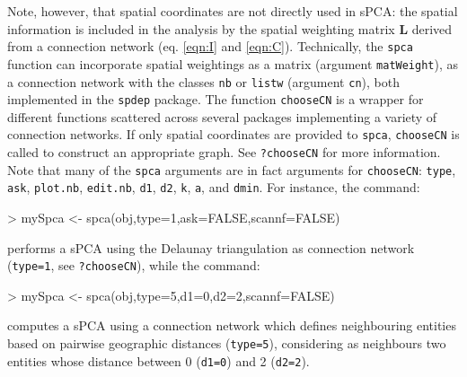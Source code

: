\documentclass{article}
\newcommand{\m}[1]{\mathbf{#1}}
\begin{document}
Note, however, that spatial coordinates are not directly used in sPCA:
the spatial information is included in the analysis by the spatial
weighting matrix $\m{L}$ derived from a connection network (eq. \ref{eqn:I} and \ref{eqn:C}).
Technically, the \texttt{spca} function can incorporate spatial weightings as a matrix (argument
\texttt{matWeight}), as a connection network with the classes
\texttt{nb} or \texttt{listw} (argument \texttt{cn}), both implemented in the \texttt{spdep} package.
The function \texttt{chooseCN} is a wrapper for different functions
scattered across several packages implementing a variety of connection networks.
If only spatial coordinates are provided to \texttt{spca},
\texttt{chooseCN} is called to construct an appropriate graph.
See \texttt{?chooseCN} for more information.
Note that many of the \texttt{spca} arguments are in fact arguments
for \texttt{chooseCN}: \texttt{type}, \texttt{ask}, \texttt{plot.nb},
\texttt{edit.nb}, \texttt{d1}, \texttt{d2}, \texttt{k}, \texttt{a}, and \texttt{dmin}.
For instance, the command:
\begin{Schunk}
\begin{Sinput}
> mySpca <- spca(obj,type=1,ask=FALSE,scannf=FALSE)
\end{Sinput}
\end{Schunk}
\noindent performs a sPCA using the Delaunay triangulation as
connection network (\texttt{type=1}, see \texttt{?chooseCN}), while
the command:
\begin{Schunk}
\begin{Sinput}
> mySpca <- spca(obj,type=5,d1=0,d2=2,scannf=FALSE)
\end{Sinput}
\end{Schunk}
\noindent computes a sPCA using a connection network which defines
neighbouring entities based on pairwise geographic distances (\texttt{type=5}),
considering as neighbours two entities whose distance between 0 (\texttt{d1=0}) and 2 (\texttt{d2=2}).
\\
\end{document}
